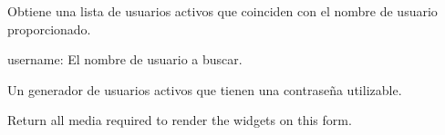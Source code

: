 \documentclass[letterpaper,10pt,spanish]{sphinxmanual}
\begin{document}
\begin{fulllineitems}
\begin{fulllineitems}

\pysigstartsignatures
{}
\pysigstopsignatures
\end{fulllineitems}



\begin{fulllineitems}

\pysigstartsignatures
{}
\pysigstopsignatures
\sphinxAtStartPar
Obtiene una lista de usuarios activos que coinciden con el nombre de usuario proporcionado.
\begin{description}
\sphinxAtStartPar
username: El nombre de usuario a buscar.

\sphinxAtStartPar
Un generador de usuarios activos que tienen una contraseña utilizable.

\end{description}

\end{fulllineitems}



\begin{fulllineitems}

\pysigstartsignatures
{}
\pysigstopsignatures
\sphinxAtStartPar
Return all media required to render the widgets on this form.

\end{fulllineitems}


\end{fulllineitems}
\end{document}
